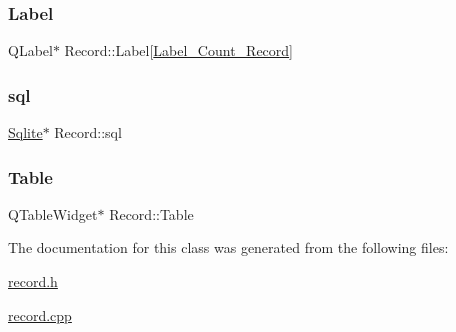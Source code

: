 \mbox{\label{class_record_a63bd65b95f9c397e2fb7102fae2dbb4b}} 
\subsubsection{\texorpdfstring{Label}{Label}}
{\footnotesize\ttfamily Q\+Label$\ast$ Record\+::\+Label\mbox{[}\mbox{\hyperlink{record_8h_add5f3d7c7526d68cc7cff1d173adf1a1}{Label\+\_\+\+Count\+\_\+\+Record}}\mbox{]}\hspace{0.3cm}{\ttfamily [private]}}

\mbox{\label{class_record_ab108613bccbe5871d86f87802689e8ad}} 
\subsubsection{\texorpdfstring{sql}{sql}}
{\footnotesize\ttfamily \mbox{\hyperlink{class_sqlite}{Sqlite}}$\ast$ Record\+::sql\hspace{0.3cm}{\ttfamily [private]}}

\mbox{\label{class_record_a09a1c40c5b575561e3979ea0ea650110}} 
\subsubsection{\texorpdfstring{Table}{Table}}
{\footnotesize\ttfamily Q\+Table\+Widget$\ast$ Record\+::\+Table\hspace{0.3cm}{\ttfamily [private]}}



The documentation for this class was generated from the following files\+:\begin{DoxyCompactItemize}
\item 
\mbox{\hyperlink{record_8h}{record.\+h}}\item 
\mbox{\hyperlink{record_8cpp}{record.\+cpp}}\end{DoxyCompactItemize}
